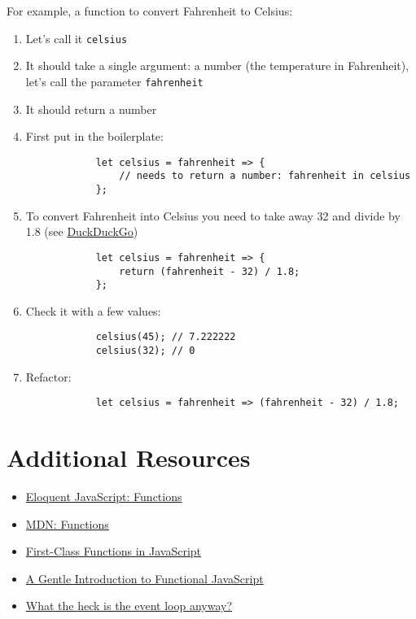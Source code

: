 For example, a function to convert Fahrenheit to Celsius:

\begin{enumerate}
    \item Let's call it \texttt{celsius}
    \item It should take a single argument: a number (the temperature in Fahrenheit), let's call the parameter \texttt{fahrenheit}
    \item It should return a number
    \item First put in the boilerplate:
        \begin{verbatim}
            let celsius = fahrenheit => {
                // needs to return a number: fahrenheit in celsius
            };
        \end{verbatim}
    \item To convert Fahrenheit into Celsius you need to take away 32 and divide by 1.8 (see \href{https://duckduckgo.com}{DuckDuckGo})
        \begin{verbatim}
            let celsius = fahrenheit => {
                return (fahrenheit - 32) / 1.8;
            };
        \end{verbatim}
    \item Check it with a few values:
        \begin{verbatim}
            celsius(45); // 7.222222
            celsius(32); // 0
        \end{verbatim}
    \item Refactor:
        \begin{verbatim}
            let celsius = fahrenheit => (fahrenheit - 32) / 1.8;
        \end{verbatim}
\end{enumerate}



\section{Additional Resources}

\begin{itemize}[leftmargin=*]
    \item \href{https://eloquentjavascript.net/03_functions.html}{Eloquent JavaScript: Functions}
    \item \href{https://developer.mozilla.org/en-US/docs/Web/JavaScript/Reference/Functions}{MDN: Functions}
    \item \href{https://nick.scialli.me/first-class-functions-in-javascript/}{First-Class Functions in JavaScript}
    \item \href{https://jrsinclair.com/articles/2016/gentle-introduction-to-functional-javascript-intro/}{A Gentle Introduction to Functional JavaScript}
    \item \href{https://www.youtube.com/watch?v=8aGhZQkoFbQ}{What the heck is the event loop anyway?}
\end{itemize}
